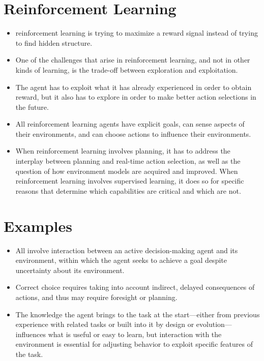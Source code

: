 \documentclass{article}
\begin{document}
\maketitle

\section{Reinforcement Learning}
\begin{itemize}
    \item reinforcement learning is trying to maximize a reward signal instead of trying to find hidden structure.
    \item One of the challenges that arise in reinforcement learning, and not in other kinds of learning, is the trade-off between exploration and exploitation.
    \item The agent has to exploit what it has already experienced in order to obtain reward, but it also has to explore in order to make better action selections in the future.
    \item All reinforcement learning agents have explicit goals, can sense aspects of their environments, and can choose actions to influence their environments.
    \item When reinforcement learning involves planning, it has to address the interplay between planning and real-time action selection, as well as the question of how environment models are acquired and improved. When reinforcement learning involves supervised learning, it does so for specific reasons that determine which capabilities are critical and which are not.
\end{itemize}

\section{Examples}
\begin{itemize}
    \item All involve interaction between an active decision-making agent and its environment, within which the agent seeks to achieve a goal despite uncertainty about its environment.
    \item Correct choice requires taking into account indirect, delayed consequences of actions, and thus may require foresight or planning.
    \item The knowledge the agent brings to the task at the start—either from previous experience with related tasks or built into it by design or evolution—influences what is useful or easy to learn, but interaction with the environment is essential for adjusting behavior to exploit specific features of the task.
\end{itemize}
\end{document}
